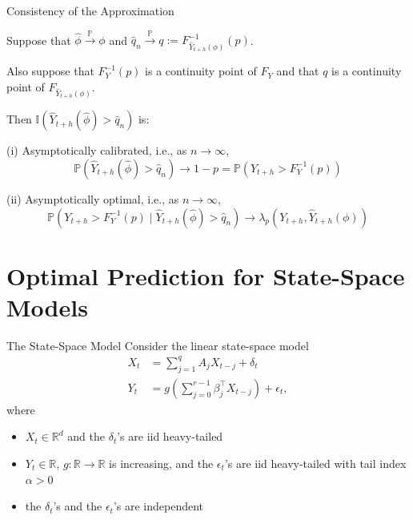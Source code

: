\documentclass{beamer}
\def\I{\mathbb I}
\def\P{\mathbb P}
\def\R{\mathbb R}
\newcommand{\AROptPred}[3]{\hat{Y}_{#1 + #2}(#3)}
\newcommand{\approxAROptPred}[3]{\hat{Y}_{#1 + #2}(\hat{#3})}
\begin{document}
\begin{frame}{Consistency of the Approximation}
    \begin{theorem}
        Suppose that $\hat{\phi} \xrightarrow{\P} \phi$ and $\hat{q}_n \xrightarrow{\P} q := F_{\AROptPred{t}{h}{\phi}}^{-1}(p)$.
        
        Also suppose that $F_Y^{-1}(p)$ is a continuity point of $F_Y$ and that $q$ is a continuity point of $F_{\AROptPred{t}{h}{\phi}}$.
        
        Then $\I(\approxAROptPred{t}{h}{\phi} > \hat{q}_n)$ is:
        
        (i) Asymptotically calibrated, i.e., as $n \to \infty$,
        \[
        \P(\approxAROptPred{t}{h}{\phi} > \hat{q}_n) \to 1 - p = \P(Y_{t + h} > F_Y^{-1}(p))
        \]
        
        (ii) Asymptotically optimal, i.e., as $n \to \infty$,
        \[
        \P(Y_{t+h} > F_Y^{-1}(p) \mid \approxAROptPred{t}{h}{\phi} > \hat{q}_n) \to \lambda_p(Y_{t + h}, \AROptPred{t}{h}{\phi})
        \]
    \end{theorem}
\end{frame}

\section{Optimal Prediction for State-Space Models}

\begin{frame}{The State-Space Model}
    Consider the linear state-space model
    \begin{equation}\label{eq:orig_ssm}
        \begin{split}
            X_t &= \sum_{j = 1}^q A_j X_{t - j} + \delta_t \\
            Y_t &= g \left( \sum_{j = 0}^{r - 1} \beta_j^{\top} X_{t - j} \right) + \epsilon_t,
        \end{split}
    \end{equation}
    where
    \begin{itemize}
        \item $X_t \in \R^d$ and the $\delta_t$'s are iid heavy-tailed
        \item $Y_t \in \R$, $g :\R \to \R$ is increasing, and the $\epsilon_t$'s are iid heavy-tailed with tail index $\alpha > 0$
        \item the $\delta_t$'s and the $\epsilon_t$'s are independent
    \end{itemize}
\end{frame}
\end{document}
